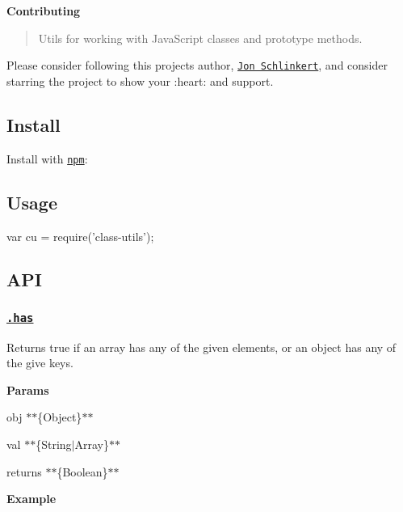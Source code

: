 {\bfseries Contributing}

\begin{quote}
Utils for working with Java\+Script classes and prototype methods. \end{quote}


Please consider following this project\textquotesingle{}s author, \href{https://github.com/jonschlinkert}{\tt Jon Schlinkert}, and consider starring the project to show your \+:heart\+: and support.

\subsection*{Install}

Install with \href{https://www.npmjs.com/}{\tt npm}\+:




\subsection*{Usage}


\begin{DoxyCode}
var cu = require('class-utils');
\end{DoxyCode}


\subsection*{A\+PI}

\subsubsection*{\href{index.js#L43}{\tt .has}}

Returns true if an array has any of the given elements, or an object has any of the give keys.

{\bfseries Params}


\begin{DoxyItemize}
\item {\ttfamily obj} $\ast$$\ast$\{Object\}$\ast$$\ast$
\item {\ttfamily val} $\ast$$\ast$\{String$\vert$\+Array\}$\ast$$\ast$
\item {\ttfamily returns} $\ast$$\ast$\{Boolean\}$\ast$$\ast$
\end{DoxyItemize}

{\bfseries Example}



